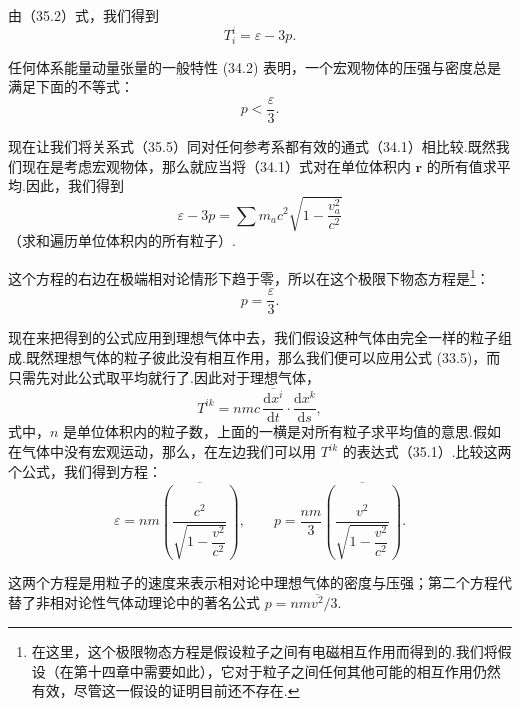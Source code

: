 由（35.2）式，我们得到
\begin{equation}
  T_i^i=\varepsilon-3p.
\end{equation}

任何体系能量动量张量的一般特性 (34.2)
表明，一个宏观物体的压强与密度总是满足下面的不等式：
\begin{equation}
  p<\frac{\varepsilon}{3}.
\end{equation}

现在让我们将关系式（35.5）同对任何参考系都有效的通式（34.1）相比较.既然我们现在是考虑宏观物体，那么就应当将（34.1）式对在单位体积内
$\boldsymbol{r}$ 的所有值求平均.因此，我们得到
\begin{equation}
  \varepsilon-3p=\sum m_ac^2\sqrt{1-\frac{v_a^2}{c^2}}
\end{equation}
（求和遍历单位体积内的所有粒子）.

这个方程的右边在极端相对论情形下趋于零，所以在这个极限下物态方程是\footnote{在这里，这个极限物态方程是假设粒子之间有电磁相互作用而得到的.我们将假设（在第十四章中需要如此），它对于粒子之间任何其他可能的相互作用仍然有效，尽管这一假设的证明目前还不存在.}：
\begin{equation}
  p=\frac{\varepsilon}{3}.
\end{equation}

现在来把得到的公式应用到理想气体中去，我们假设这种气体由完全一样的粒子组成.既然理想气体的粒子彼此没有相互作用，那么我们便可以应用公式
(33.5)，而只需先对此公式取平均就行了.因此对于理想气体，
\begin{equation*}
  T^{ik}=nmc\,\overline{\frac{\mathrm{d}x^i}{\mathrm{d}t}}
  \cdot\frac{\mathrm{d}x^k}{\mathrm{d}s},
\end{equation*}
式中，$n$
是单位体积内的粒子数，上面的一横是对所有粒子求平均值的意思.假如在气体中没有宏观运动，那么，在左边我们可以用
$T^{ik}$ 的表达式（35.1）.比较这两个公式，我们得到方程：
\begin{equation}
  \varepsilon=nm\overline{\left(\frac{c^2}
  {\sqrt{1-\dfrac{v^2}{c^2}}}\right)},\qquad
  p=\frac{nm}{3}\overline{\left(\frac{v^2}
  {\sqrt{1-\dfrac{v^2}{c^2}}}\right)}.
\end{equation}

这两个方程是用粒子的速度来表示相对论中理想气体的密度与压强；第二个方程代替了非相对论性气体动理论中的著名公式
$p=nm\overline{v^2}/3$.
